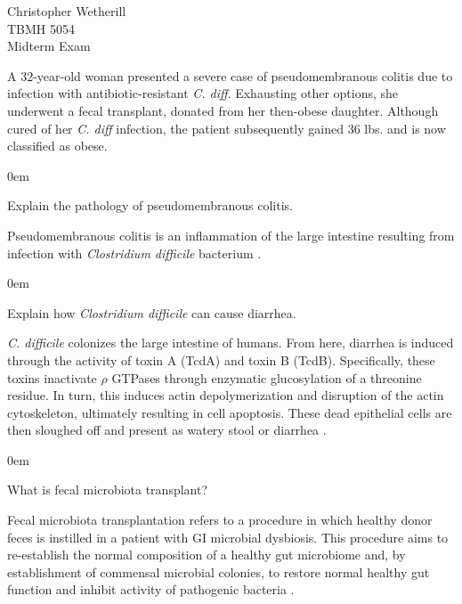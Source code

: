 \documentclass[11pt,letterpaper,final] {article}
\newenvironment{exercise}[2][Exercise]{\begin{trivlist}
	\item[\hskip \labelsep {\bfseries #1}\hskip \labelsep {\bfseries #2.}]}{\end{trivlist}}
\newenvironment{problem}[2][Problem]{\begin{addmargin}[0.5in]{0em} \begin{trivlist}
	\item[\hskip \labelsep {\bfseries #1}\hskip \labelsep {\bfseries #2.}]}{\end{trivlist}\end{addmargin}}
\begin{document}

\noindent Christopher Wetherill \\
TBMH 5054 \\
Midterm Exam \\[1cm]

\begin{exercise}[Exercise]{1} A 32-year-old woman presented a severe case of pseudomembranous colitis due to infection with antibiotic-resistant \textit{C. diff}. Exhausting other options, she underwent a fecal transplant, donated from her then-obese daughter. Although cured of her \textit{C. diff} infection, the patient subsequently gained 36 lbs. and is now classified as obese.\\

	\begin{problem}[Problem]{A} Explain the pathology of pseudomembranous colitis.
	
	Pseudomembranous colitis is an inflammation of the large intestine resulting from infection with \textit{Clostridium difficile} bacterium \cite{Moreno:2013}.\\
	
	\end{problem}
	
	\begin{problem}[Problem]{B} Explain how \textit{Clostridium difficile} can cause diarrhea.
	
	\textit{C. difficile} colonizes the large intestine of humans. From here, diarrhea is induced through the activity of toxin A (TcdA) and toxin B (TcdB). Specifically, these toxins inactivate $\rho$ GTPases through enzymatic glucosylation of a threonine residue. In turn, this induces actin depolymerization and disruption of the actin cytoskeleton, ultimately resulting in cell apoptosis. These dead epithelial cells are then sloughed off and present as watery stool or diarrhea \cite{Burke:2014}.\\
	
	\end{problem}
	
	\begin{problem}[Problem]{C} What is fecal microbiota transplant?
	
	Fecal microbiota transplantation refers to a procedure in which healthy donor feces is instilled in a patient with GI microbial dysbiosis. This procedure aims to re-establish the normal composition of a healthy gut microbiome and, by establishment of commensal microbial colonies, to restore normal healthy gut function and inhibit activity of pathogenic bacteria \cite{Vecchio:2014}.\\
	

\end{problem}
\end{exercise}
\end{document}
